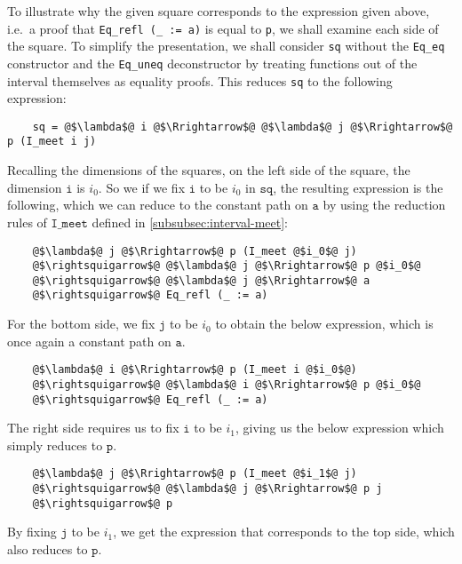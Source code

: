 \documentclass[12pt,twoside,maitrise]{dms}
\theoremstyle{definition}
\numberwithin{equation}{section}
\numberwithin{table}{chapter}
\numberwithin{figure}{chapter}
\newcommand\id[1] {\texttt{#1}}
\newcommand\fn[1] {\texttt{#1}}
\begin{document}
To illustrate why the given square corresponds to the expression given above,
i.e.\ a proof that \fn{Eq\_refl (\_ := a)} is equal to \id{p}, we shall examine
each side of the square. To simplify the presentation, we shall consider \id{sq}
without the \id{Eq\_eq} constructor and the \id{Eq\_uneq} deconstructor by
treating functions out of the interval themselves as equality proofs. This
reduces \id{sq} to the following expression:

\begin{verbatim}
    sq = @$\lambda$@ i @$\Rrightarrow$@ @$\lambda$@ j @$\Rrightarrow$@ p (I_meet i j)
\end{verbatim}

Recalling the dimensions of the squares, on the left side of the square, the
dimension $\fn{i}$ is $i_0$. So we if we fix $\fn{i}$ to be $i_0$ in $\fn{sq}$,
the resulting expression is the following, which we can reduce to the constant
path on $\fn{a}$ by using the reduction rules of $\fn{I\_meet}$ defined in
\autoref{subsubsec:interval-meet}:

\begin{verbatim}
    @$\lambda$@ j @$\Rrightarrow$@ p (I_meet @$i_0$@ j)
    @$\rightsquigarrow$@ @$\lambda$@ j @$\Rrightarrow$@ p @$i_0$@
    @$\rightsquigarrow$@ @$\lambda$@ j @$\Rrightarrow$@ a
    @$\rightsquigarrow$@ Eq_refl (_ := a)
\end{verbatim}

For the bottom side, we fix $\fn{j}$ to be $i_0$ to obtain the below expression,
which is once again a constant path on $\fn{a}$.

\begin{verbatim}
    @$\lambda$@ i @$\Rrightarrow$@ p (I_meet i @$i_0$@)
    @$\rightsquigarrow$@ @$\lambda$@ i @$\Rrightarrow$@ p @$i_0$@
    @$\rightsquigarrow$@ Eq_refl (_ := a)
\end{verbatim}

The right side requires us to fix $\fn{i}$ to be $i_1$, giving us the below
expression which simply reduces to $\fn{p}$.

\begin{verbatim}
    @$\lambda$@ j @$\Rrightarrow$@ p (I_meet @$i_1$@ j)
    @$\rightsquigarrow$@ @$\lambda$@ j @$\Rrightarrow$@ p j
    @$\rightsquigarrow$@ p
\end{verbatim}

By fixing $\fn{j}$ to be $i_1$, we get the expression that corresponds to the top side, which also reduces to $\fn{p}$.
\end{document}
